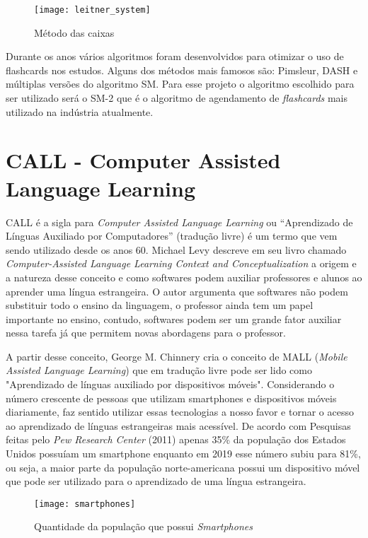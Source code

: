 \begin{figure}[H]
	\caption{\label{fig:leitner_system}Método das caixas}
	\begin{center}
		\texttt{[image: leitner\_system]}
	\end{center}
\end{figure}


Durante os anos vários algoritmos foram desenvolvidos para otimizar o uso de flashcards nos estudos. Alguns dos métodos mais famosos são: Pimsleur, DASH e múltiplas versões do algoritmo SM. Para esse projeto o algoritmo escolhido para ser utilizado será o SM-2 que é o algoritmo de agendamento de \textit{flashcards} mais utilizado na indústria atualmente.

\section{CALL - Computer Assisted Language Learning}
CALL é a sigla para \textit{Computer Assisted Language Learning} ou “Aprendizado de Línguas Auxiliado por Computadores” (tradução livre) é um termo que vem sendo utilizado desde os anos 60. Michael Levy descreve em seu livro chamado \textit{Computer-Assisted Language Learning Context and Conceptualization} a origem e a natureza desse conceito e como softwares podem auxiliar professores e alunos ao aprender uma língua estrangeira. O autor argumenta que softwares não podem substituir todo o ensino da linguagem, o professor ainda tem um papel importante no ensino, contudo, softwares podem ser um grande fator auxiliar nessa tarefa já que permitem novas abordagens para o professor.

A partir desse conceito, George M. Chinnery cria o conceito de MALL (\textit{Mobile Assisted Language Learning}) que em tradução livre pode ser lido como "Aprendizado de línguas auxiliado por dispositivos móveis". Considerando o número crescente de pessoas que utilizam smartphones e dispositivos móveis diariamente, faz sentido utilizar essas tecnologias a nosso favor e tornar o acesso ao aprendizado de línguas estrangeiras mais acessível. De acordo com Pesquisas feitas pelo \textit{Pew Research Center} (2011) apenas 35\% da população dos Estados Unidos possuíam um smartphone enquanto em 2019 esse número subiu para 81\%, ou seja, a maior parte da população norte-americana possui um dispositivo móvel que pode ser utilizado para o aprendizado de uma língua estrangeira.

\begin{figure}[H]
	\caption{\label{fig:smartphones}Quantidade da população que possui \textit{Smartphones}}
	\begin{center}
		\texttt{[image: smartphones]}
	\end{center}
\end{figure}


